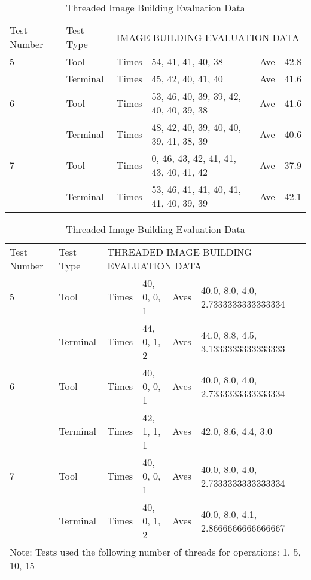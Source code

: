 \begin{table}[h!]
\begin{tabular}{llllll}
Test Number & Test Type & \multicolumn{4}{l}{IMAGE BUILDING EVALUATION DATA}          \\
5           & Tool      & Times & 54, 41, 41, 40, 38                     & Ave & 42.8 \\
            & Terminal  & Times & 45, 42, 40, 41, 40                     & Ave & 41.6 \\
6           & Tool      & Times & 53, 46, 40, 39, 39, 42, 40, 40, 39, 38 & Ave & 41.6 \\
            & Terminal  & Times & 48, 42, 40, 39, 40, 40, 39, 41, 38, 39 & Ave & 40.6 \\
7           & Tool      & Times & 0, 46, 43, 42, 41, 41, 43, 40, 41, 42  & Ave & 37.9 \\
            & Terminal  & Times & 53, 46, 41, 41, 40, 41, 41, 40, 39, 39 & Ave & 42.1
\end{tabular}
\caption{Image Building Evaluation Data}
\label{tab:imageBuild}


\begin{tabular}{llllll}
Test Number  & Test Type  & \multicolumn{4}{l}{THREADED IMAGE BUILDING EVALUATION DATA}         \\
5            & Tool       & Times  & 40, 0, 0, 1  & Aves  & 40.0, 8.0, 4.0, 2.7333333333333334  \\
             & Terminal   & Times  & 44, 0, 1, 2  & Aves  & 44.0, 8.8, 4.5, 3.1333333333333333  \\
6            & Tool       & Times  & 40, 0, 0, 1  & Aves  & 40.0, 8.0, 4.0, 2.7333333333333334  \\
             & Terminal   & Times  & 42, 1, 1, 1  & Aves  & 42.0, 8.6, 4.4, 3.0                 \\
7            & Tool       & Times  & 40, 0, 0, 1  & Aves  & 40.0, 8.0, 4.0, 2.7333333333333334  \\
             & Terminal   & Times  & 40, 0, 1, 2  & Aves  & 40.0, 8.0, 4.1, 2.8666666666666667  \\
\multicolumn{6}{l}{Note: Tests used the following number of threads for operations: 1, 5, 10, 15}
\end{tabular}
\caption{Threaded Image Building Evaluation Data}
\label{tab:threadBuild}

\end{table}
